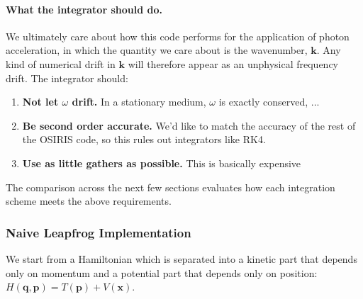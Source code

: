 \paragraph{What the integrator should do.} We ultimately care about how this
code performs for the application of photon acceleration, in which the quantity
we care about is the wavenumber, $\mathbf{k}$. Any kind of numerical drift in
$\mathbf{k}$ will therefore appear as an unphysical frequency drift. The 
integrator should:
\begin{enumerate}

    \item \textbf{Not let $\omega$ drift.} In a stationary medium, $\omega$ is
    exactly conserved, ...

    \item \textbf{Be second order accurate.} We'd like to match the accuracy of
    the rest of the OSIRIS code, so this rules out integrators like RK4.

    \item \textbf{Use as little gathers as possible.} This is basically expensive

\end{enumerate}
The comparison across the next few sections evaluates how each integration 
scheme meets the above requirements.

\subsubsection{Naive Leapfrog Implementation}
We start from a Hamiltonian which is separated into a kinetic part that depends
only on momentum and a potential part that depends only on position: 
$H(\mathbf{q}, \mathbf{p}) = T(\mathbf{p}) + V(\mathbf{x})$.

